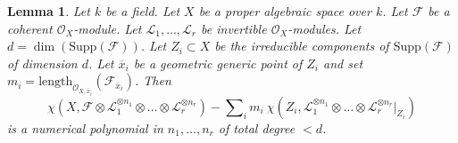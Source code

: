 \documentclass{stacks-project}
\theoremstyle{plain}
\newtheorem{lemma}[subsection]{Lemma}
\theoremstyle{definition}
\theoremstyle{remark}
\numberwithin{equation}{subsection}
\begin{document}
\begin{lemma}
\label{lemma-numerical-polynomial-leading-term}
Let $k$ be a field. Let $X$ be a proper algebraic space over $k$. Let
$\mathcal{F}$ be a coherent $\mathcal{O}_X$-module. Let
$\mathcal{L}_1, \ldots, \mathcal{L}_r$ be invertible $\mathcal{O}_X$-modules.
Let $d = \dim(\text{Supp}(\mathcal{F}))$.
Let $Z_i \subset X$ be the irreducible components
of $\text{Supp}(\mathcal{F})$ of dimension $d$. Let $\overline{x}_i$
be a geometric generic point of $Z_i$ and set
$m_i = \text{length}_{\mathcal{O}_{X, \overline{x}_i}}
(\mathcal{F}_{\overline{x}_i})$.
Then
$$
\chi(X, \mathcal{F} \otimes \mathcal{L}_1^{\otimes n_1} \otimes \ldots \otimes
\mathcal{L}_r^{\otimes n_r}) -
\sum\nolimits_i
m_i\ \chi(Z_i, \mathcal{L}_1^{\otimes n_1} \otimes \ldots \otimes
\mathcal{L}_r^{\otimes n_r}|_{Z_i})
$$
is a numerical polynomial in $n_1, \ldots, n_r$ of total degree $< d$.
\end{lemma}
\end{document}
